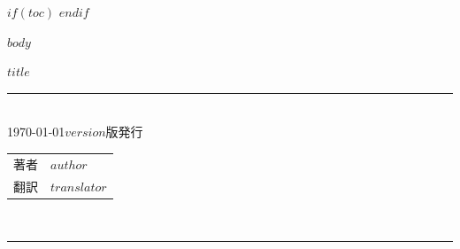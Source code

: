 \documentclass[oneside,12pt,uplatex]{jsbook}
\begin{document}
\clearpage

$if(toc)$
\tableofcontents
\clearpage
$endif$

$body$

\clearpage
\thispagestyle{empty}
\vspace*{\fill}

{\noindent\Large{$title$}} \\
\rule[8pt]{14cm}{1pt} \\
{\noindent
\today $version$版発行
\noindent
}
\bigskip\\
\begin{tabular}{ll}
著者 & $author$ \\
翻訳 & $translator$ \\
\end{tabular}
\bigskip\\
\rule[0pt]{14cm}{1pt} \\
\end{document}
